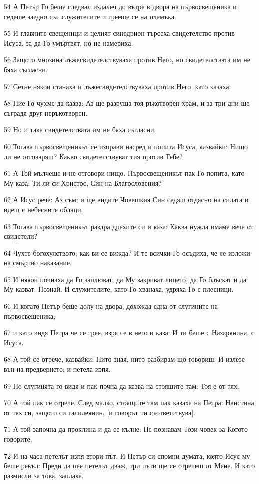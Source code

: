 \par 54 А Петър Го беше следвал издалеч до вътре в двора на първосвещеника и седеше заедно със служителите и грееше се на пламъка.
\par 55 И главните свещеници и целият синедрион търсеха свидетелство против Исуса, за да Го умъртвят, но не намериха.
\par 56 Защото мнозина лъжесвидетелствуваха против Него, но свидетелствата им не бяха съгласни.
\par 57 Сетне някои станаха и лъжесвидетелствуваха против Него, като казаха:
\par 58 Ние Го чухме да казва: Аз ще разруша тоя ръкотворен храм, и за три дни ще съградя друг неръкотворен.
\par 59 Но и така свидетелствата им не бяха съгласни.
\par 60 Тогава първосвещеникът се изправи насред и попита Исуса, казвайки: Нищо ли не отговаряш? Какво свидетелствуват тия против Тебе?
\par 61 А Той мълчеше и не отговори нищо. Първосвещеникът пак Го попита, като Му каза: Ти ли си Христос, Син на Благословения?
\par 62 А Исус рече: Аз съм; и ще видите Човешкия Син седящ отдясно на силата и идещ с небесните облаци.
\par 63 Тогава първосвещеникът раздра дрехите си и каза: Каква нужда имаме вече от свидетели?
\par 64 Чухте богохулството; как ви се вижда? И те всички Го осъдиха, че се изложи на смъртно наказание.
\par 65 И някои почнаха да Го заплюват, да Му закриват лицето, да Го блъскат и да Му казват: Познай. И служителите, като Го хванаха, удряха Го с плесници.
\par 66 И когато Петър беше долу на двора, дохожда една от слугините на първосвещеника;
\par 67 и като видя Петра че се грее, взря се в него и каза: И ти беше с Назарянина, с Исуса.
\par 68 А той се отрече, казвайки: Нито зная, нито разбирам що говориш. И излезе вън на предверието; и петела изпя.
\par 69 Но слугинята го видя и пак почна да казва на стоящите там: Тоя е от тях.
\par 70 А той пак се отрече. След малко, стоящите там пак казаха на Петра: Наистина от тях си, защото си галилеянин, [и говорът ти съответствува].
\par 71 А той започна да проклина и да се кълне: Не познавам Този човек за Когото говорите.
\par 72 И на часа петелът изпя втори път. И Петър си спомни думата, която Исус му беше рекъл: Преди да пее петелът дваж, три пъти ще се отречеш от Мене. И като размисли за това, заплака.

